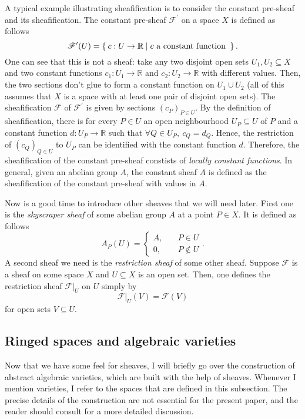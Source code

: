 A typical example illustrating sheafification is to consider the constant
pre-sheaf and its sheafification. The constant pre-sheaf
$\mathscr{F}^{\prime}$ on a space $X$ is defined as follows
\[
  \mathscr{F}^{\prime}(U) =\Set{c: U\to\mathbb{R}\mid c
    \text{ a constant function }}.
\]
One can see that this is not a sheaf: take any two disjoint open sets
$U_{1}, U_{2}\subseteq X$ and two constant functions $c_{1}:U_{1}\to
\mathbb{R}$ and $c_{2}:U_{2}\to\mathbb{R}$ with different values.
Then, the two sections don't glue to form a constant function on
$U_{1}\cup U_{2}$ (all of this assumes that $X$ is a space with
at least one pair of disjoint open sets). The sheafification $\mathscr{F}$ of
$\mathscr{F}^{\prime}$ is given by sections $(c_{P})_{P\in U}$. By the
definition of sheafification, there is for every $P\in U$ an open
neighbourhood $U_{P}\subseteq U$ of $P$ and a constant function
$d: U_{P}\to\mathbb{R}$ such that $\forall Q\in U_{P},\ c_{Q}=d_{Q}$.
Hence, the restriction of $(c_{Q})_{Q\in U}$ to $U_{P}$ can be identified
with the constant function $d$. Therefore, the sheafification of the constant
pre-sheaf constists of \emph{locally constant functions}. In general, given
an abelian group $A$, the constant sheaf $\underline{A}$ is defined
as the sheafification of the constant pre-sheaf with values in $A$.

Now is a good time to introduce other sheaves that we will need later.
First one is the \emph{skyscraper sheaf} of some abelian group $A$ at a point
$P\in X$. It is defined as follows
\[
  A_{P}(U)=\begin{cases}
    A, & \quad P\in U \\
    0, & \quad P\not\in U
  \end{cases}.
\]
A second sheaf we need is the \emph{restriction sheaf} of some other sheaf.
Suppose $\mathscr{F}$ is a sheaf on some space $X$ and $U\subseteq X$ is
an open set. Then, one defines the restriction sheaf $\mathscr{F}\vert_{U}$
on $U$ simply by
\[
  \mathscr{F}\vert_{U}(V)=\mathscr{F}(V)
\]
for open sets $V\subseteq U$.

\subsection{Ringed spaces and algebraic varieties}
Now that we have some feel for sheaves, I will briefly go over the
construction of abstract algebraic varieties, which are built with the help
of sheaves. Whenever I mention varieties, I refer to the spaces that are
defined in this subsection. The precise details of the construction are not
essential for the present paper, and the reader should consult
\cite{gathmann} for a more detailed discussion.

